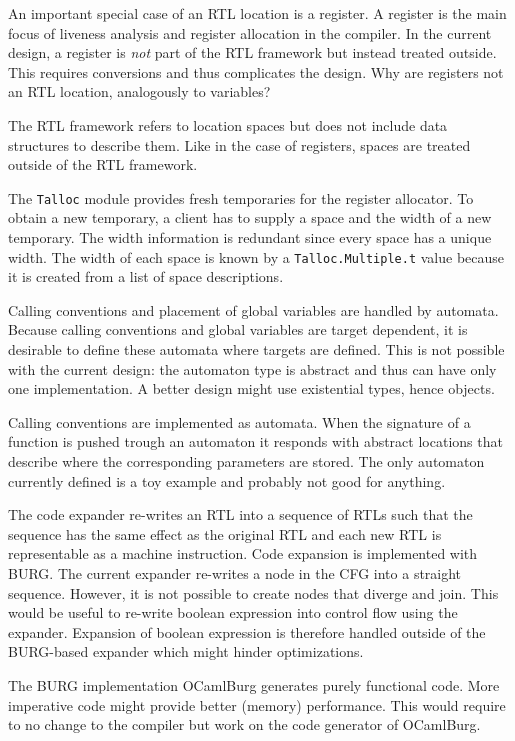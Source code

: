 \documentclass[11pt]{article}
\newcommand\CFG{{\small CFG}}
\newcommand\rtl{{\small RTL}}
\newcommand\burg{{\small BURG}}
\begin{document}
An important special case of an {\rtl} location is a register.  A
register is the main focus of liveness analysis and register allocation
in the compiler. In the current design, a register is \emph{not} part of
the {\rtl} framework but instead treated outside.  This requires
conversions and thus complicates the design.  Why are registers not an
{\rtl} location, analogously to variables?

The {\rtl} framework refers to location spaces but does not
include data structures to describe them. Like in the case of registers,
spaces are treated outside of the {\rtl} framework.   

The \texttt{Talloc} module provides fresh temporaries for the
register allocator. To obtain a new temporary, a client has to supply a
space and the width of a new temporary. The width information is
redundant since every space has a unique width. The width of each space
is known by a \texttt{Talloc.Multiple.t} value because it is created
from a list of space descriptions. 

Calling conventions and placement of global variables are handled
by automata. Because calling conventions and global variables are target
dependent, it is desirable to define these automata where targets are
defined. This is not possible with the current design: the automaton
type is abstract and thus can have only one implementation. A better
design might use existential types, hence objects.

Calling conventions are implemented as automata. When the
signature of a function is pushed trough an automaton it responds with
abstract locations that describe where the corresponding parameters are
stored. The only automaton currently defined is a toy example and
probably not good for anything.

The code expander re-writes an {\rtl} into a sequence of {\rtl}s
such that the sequence has the same effect as the original {\rtl} and
each new {\rtl} is representable as a machine instruction. Code
expansion is implemented with {\burg}. The current expander re-writes a
node in the {\CFG} into a straight sequence. However, it is not possible
to create nodes that diverge and join. This would be useful to re-write
boolean expression into control flow using the expander. Expansion of
boolean expression is therefore handled outside of the {\burg}-based
expander which might hinder optimizations. 

The {\burg} implementation OCamlBurg generates purely functional code.
More imperative code might provide better (memory) performance. This
would require to no change to the compiler but work on the code
generator of OCamlBurg.
    
\end{document}
